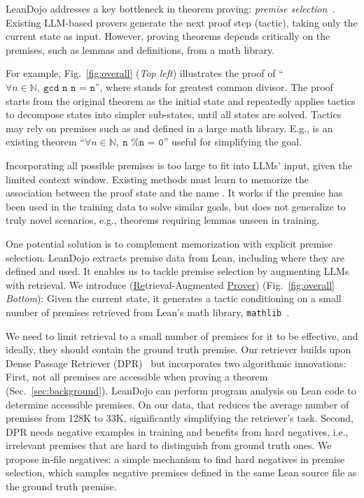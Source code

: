 LeanDojo addresses a key bottleneck in theorem proving: \emph{premise selection}~\cite{urban2004mptp,irving2016deepmath}. Existing LLM-based provers generate the next proof step (tactic), taking only the current state as input. However, proving theorems depends critically on the premises, such as lemmas and definitions, from a math library.

For example, Fig.~\ref{fig:overall} (\emph{Top left}) illustrates the proof of ``$\forall n \in \mathbb{N},~\texttt{gcd n n = n}$'', where  stands for greatest common divisor. The proof starts from the original theorem as the initial state and repeatedly applies tactics to decompose states into simpler sub-states, until all states are solved. Tactics may rely on premises such as  and  defined in a large math library. E.g.,  is an existing theorem ``$\forall n \in \mathbb{N},~\texttt{n \% n = 0}$'' useful for simplifying the goal.

Incorporating all possible premises is too large to fit into LLMs' input, given the limited context window. Existing methods must learn to memorize the association between the proof state and the name . It works if the premise has been used in the training data to solve similar goals, but does not generalize to truly novel scenarios, e.g., theorems requiring lemmas unseen in training.    

One potential solution is to complement memorization with explicit premise selection. LeanDojo extracts premise data from Lean, including where they are defined and used. It enables us to tackle premise selection by augmenting LLMs with retrieval. We introduce \emph{\name} (\underline{Re}trieval-Augmented \underline{Prover}) (Fig.~\ref{fig:overall} \emph{Bottom}): Given the current state, it generates a tactic conditioning on a small number of premises retrieved from Lean's math library, \texttt{mathlib}~\cite{mathlib}. 
 
We need to limit retrieval to a small number of premises for it to be effective, and ideally, they should contain the ground truth premise. Our retriever builds upon Dense Passage Retriever (DPR)~\cite{karpukhin2020dense} but incorporates two algorithmic innovations: First, not all premises are accessible when proving a theorem (Sec.~\ref{sec:background}). LeanDojo can perform program analysis on Lean code to determine accessible premises. On our data, that reduces the average number of premises from 128K to 33K, significantly simplifying the retriever's task. Second, DPR needs negative examples in training and benefits from hard negatives, i.e., irrelevant premises that are hard to distinguish from ground truth ones. We propose in-file negatives: a simple mechanism to find hard negatives in premise selection, which samples negative premises defined in the same Lean source file as the ground truth premise. 


